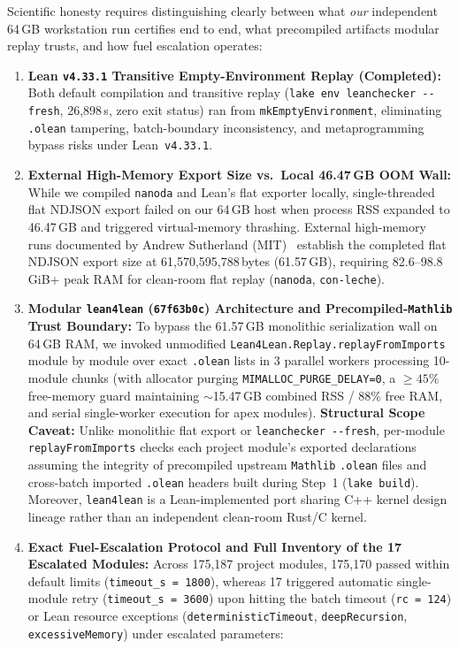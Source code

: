 \documentclass[11pt,a4paper]{article}
\begin{document}
Scientific honesty requires distinguishing clearly between what \emph{our} independent 64\,GB workstation run certifies end to end, what precompiled artifacts modular replay trusts, and how fuel escalation operates:
\begin{enumerate}
  \item \textbf{Lean \texttt{v4.33.1} Transitive Empty-Environment Replay (Completed):} Both default compilation and transitive replay (\texttt{lake env leanchecker -{}-fresh}, 26,898\,s, zero exit status) ran from \texttt{mkEmptyEnvironment}, eliminating \texttt{.olean} tampering, batch-boundary inconsistency, and metaprogramming bypass risks under Lean~\texttt{v4.33.1}.
  \item \textbf{External High-Memory Export Size vs.\ Local 46.47\,GB OOM Wall:} While we compiled \texttt{nanoda} and Lean's flat exporter locally, single-threaded flat NDJSON export failed on our 64\,GB host when process RSS expanded to 46.47\,GB and triggered virtual-memory thrashing. External high-memory runs documented by Andrew Sutherland (MIT)~\cite{sutherland2026} establish the completed flat NDJSON export size at 61,570,595,788\,bytes (61.57\,GB), requiring 82.6--98.8\,GiB+ peak RAM for clean-room flat replay (\texttt{nanoda}, \texttt{con-leche}).
  \item \textbf{Modular \texttt{lean4lean} (\texttt{67f63b0c}) Architecture and Precompiled-\texttt{Mathlib} Trust Boundary:} To bypass the 61.57\,GB monolithic serialization wall on 64\,GB RAM, we invoked unmodified \texttt{Lean4Lean.Replay.replayFromImports}~\cite{carneiro2026} module by module over exact \texttt{.olean} lists in 3 parallel workers processing 10-module chunks (with allocator purging \texttt{MIMALLOC\_PURGE\_DELAY=0}, a $\ge 45\%$ free-memory guard maintaining $\sim$15.47\,GB combined RSS / 88\% free RAM, and serial single-worker execution for apex modules). \textbf{Structural Scope Caveat:} Unlike monolithic flat export or \texttt{leanchecker -{}-fresh}, per-module \texttt{replayFromImports} checks each project module's exported declarations assuming the integrity of precompiled upstream \texttt{Mathlib} \texttt{.olean} files and cross-batch imported \texttt{.olean} headers built during Step~1 (\texttt{lake build}). Moreover, \texttt{lean4lean} is a Lean-implemented port sharing C++ kernel design lineage rather than an independent clean-room Rust/C kernel.
  \item \textbf{Exact Fuel-Escalation Protocol and Full Inventory of the 17 Escalated Modules:} Across 175,187 project modules, 175,170 passed within default limits (\texttt{timeout\_s = 1800}), whereas 17 triggered automatic single-module retry (\texttt{timeout\_s = 3600}) upon hitting the batch timeout (\texttt{rc = 124}) or Lean resource exceptions (\texttt{deterministicTimeout}, \texttt{deepRecursion}, \texttt{excessiveMemory}) under escalated parameters:

\end{enumerate}
\end{document}
